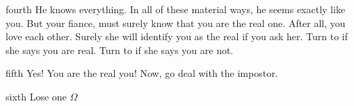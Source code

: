 \documentclass[notebook]{guildcamp1}
\begin{document}
\begin{page}{fourth}
He knows everything. In all of these material ways, he seems exactly like you. But your fiance, \cBride{} must surely know that you are the real one. After all, you love each other. Surely she will identify you as the real \cGroomB{} if you ask her. Turn to  if she says you are real. Turn to  if she says you are not.
\end{page}

\begin{page}{fifth}
Yes! You are the real you! Now, go deal with the impostor.
\end{page}

\begin{page}{sixth}
  Lose one $\Omega$
  
  \end{page}

\endnotebook
\end{document}

